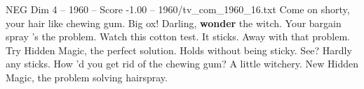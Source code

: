 \begin{textsample}{NEG Dim 4 – 1960 – Score -1.00 – 1960/tv\_com\_1960\_16.txt}  \label{ex:f4_neg_086}
Come on shorty, your hair like chewing gum.
Big ox!
Darling, \textbf{wonder} the witch.
Your bargain spray 's the problem.
Watch this cotton test.
It sticks.
Away with that problem.
Try Hidden Magic, the perfect solution.
Holds without being sticky.
See?
Hardly any sticks.
How 'd you get rid of the chewing gum?
A little witchery.
New Hidden Magic, the problem solving hairspray.

\end{textsample}
